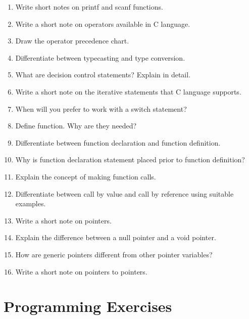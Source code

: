 \documentclass[fontsize=12pt,paper=a4]{book}
\begin{document}
\begin{enumerate}
 \item Write short notes on printf and scanf functions.
 \item Write a short note on operators available in C language.
 \item Draw the operator precedence chart.
 \item Differentiate between typecasting and type conversion.
 \item What are decision control statements? Explain in detail.
 \item Write a short note on the iterative statements that C language supports.
 \item When will you prefer to work with a switch statement?
 \item Define function. Why are they needed?
 \item Differentiate between function declaration and function definition.
 \item Why is function declaration statement placed prior to function definition?
 \item Explain the concept of making function calls.
 \item Differentiate between call by value and call by reference using suitable examples.
 \item Write a short note on pointers.
 \item Explain the difference between a null pointer and a void pointer.
 \item How are generic pointers different from other pointer variables?
 \item Write a short note on pointers to pointers.
\end{enumerate}

\section{Programming Exercises}
\end{document}
